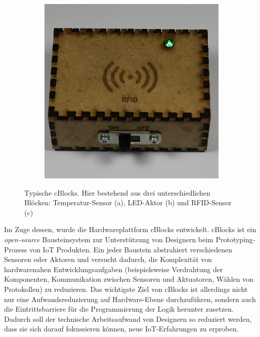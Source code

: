 \begin{figure}[ht]
\begin{subfigure}[b]{0.3\textwidth}
        \caption{}
        \label{fig:tiger}
    \end{subfigure}
    \quad
    \begin{subfigure}[b]{0.3\textwidth}
        \includegraphics[width=1\linewidth]{bilder/chapter1/RFID.png}
        \caption{}
        \label{fig:mouse}
    \end{subfigure}
    \caption{Typische \acp{cBlock}. Hier bestehend aus drei unterschiedlichen Blöcken: Temperatur-Sensor (a),  LED-Aktor (b) und RFID-Sensor (c)}
    \label{fig:cblockfoto}
\end{figure}

Im Zuge dessen, wurde die Hardwareplattform \acp{cBlock} entwickelt. \acp{cBlock} ist ein \textit{open-source} Bausteinsystem zur Unterstützung von Designern beim Prototyping-Prozess von \ac{IoT} Produkten. Ein jeder Baustein abstrahiert verschiedenen Sensoren oder Aktoren und versucht dadurch, die Komplexität von hardwarenahen Entwicklungsaufgaben (beispielsweise Verdrahtung der Komponenten, Kommunikation zwischen Sensoren und Aktuatoren, Wählen von Protokollen) zu reduzieren. Das wichtigste Ziel von \acp{cBlock} ist allerdings nicht nur eine Aufwandsreduzierung auf Hardware-Ebene durchzuführen, sondern auch die Eintrittsbarriere für die Programmierung der Logik herunter zusetzen. Dadurch soll der technische Arbeitsaufwand von Designern so reduziert werden, dass sie sich darauf fokussieren können, neue \ac{IoT}-Erfahrungen zu erproben.

